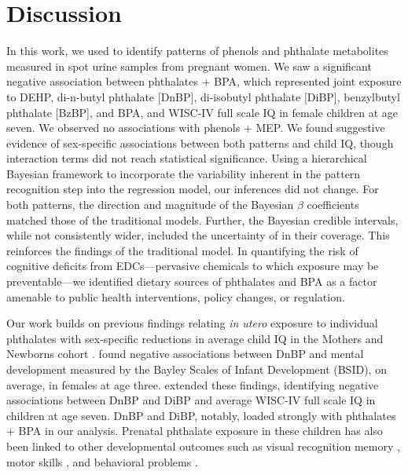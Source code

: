 \section{Discussion}
In this work, we used \bnmf to identify patterns of phenols and phthalate metabolites measured in spot urine samples from pregnant women. We saw a significant negative association between phthalates + BPA, which represented joint exposure to DEHP, di-n-butyl phthalate [DnBP], di-isobutyl phthalate [DiBP], benzylbutyl phthalate [BzBP], and BPA, and WISC-IV full scale IQ in female children at age seven. We observed no associations with phenols + MEP. We found suggestive evidence of sex-specific associations between both patterns and child IQ, though interaction terms did not reach statistical significance. Using a hierarchical Bayesian framework to incorporate the variability inherent in the pattern recognition step into the regression model, our inferences did not change. For both patterns, the direction and magnitude of the Bayesian $\beta$ coefficients matched those of the traditional models. Further, the Bayesian credible intervals, while not consistently wider, included the uncertainty of \bnmf in their coverage. This reinforces the findings of the traditional model. In quantifying the risk of cognitive deficits from EDCs---pervasive chemicals to which exposure may be preventable---we identified dietary sources of phthalates and BPA as a factor amenable to public health interventions, policy changes, or regulation.

Our work builds on previous findings relating \textit{in utero} exposure to individual phthalates with sex-specific reductions in average child IQ in the Mothers and Newborns cohort \citep{factor2014persistent, whyatt2012maternal}. \citet{whyatt2012maternal} found negative associations between DnBP and mental development measured by the Bayley Scales of Infant Development (BSID), on average, in females at age three. \citet{factor2014persistent} extended these findings, identifying negative associations between DnBP and DiBP and average WISC-IV full scale IQ in children at age seven. DnBP and DiBP, notably, loaded strongly with phthalates + BPA in our analysis. Prenatal phthalate exposure in these children has also been linked to other developmental outcomes such as visual recognition memory \citep{ipapo2017maternal}, motor skills \citep{balalian2019prenatal, daniel2020perinatal}, and behavioral problems \citep{daniel2020prenatal}.

